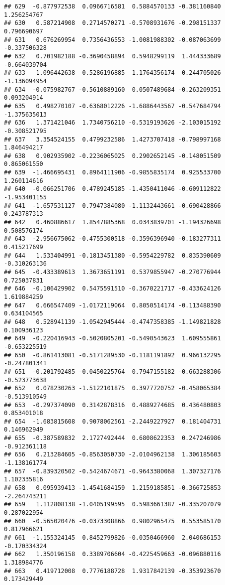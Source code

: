 \documentclass[
]{article}
\begin{document}
\begin{verbatim}
## 629  -0.877972538  0.0966716581  0.5884570133 -0.381160840  1.256254767
## 630   0.587214908  0.2714570271 -0.5708931676 -0.298151337  0.796690697
## 631   0.676269954  0.7356436553 -1.0081988302 -0.087063699 -0.337506328
## 632   0.701982188 -0.3690458894  0.5948299119  1.444333689 -0.664039704
## 633   1.096442638  0.5286196885 -1.1764356174 -0.244705026 -1.136094954
## 634  -0.075982767 -0.5610889160  0.0507489684 -0.263209351  0.093204914
## 635   0.498270107 -0.6368012226 -1.6886443567 -0.547684794 -1.375635013
## 636   1.371421046  1.7340756210 -0.5319193626 -2.103015192 -0.308521795
## 637   3.354524155  0.4799232586  1.4273707418 -0.798997168  1.846494217
## 638   0.902935902 -0.2236065025  0.2902652145 -0.148051509  0.865061550
## 639  -1.466695431  0.8964111906 -0.9855835174  0.925533700  1.260114616
## 640  -0.066251706  0.4789245185 -1.4350411046 -0.609112822 -1.953401155
## 641  -1.657531127  0.7947384080 -1.1132443661 -0.690428866  0.243787313
## 642   0.460886617  1.8547885368  0.0343839701 -1.194326698  0.508576174
## 643  -2.956675062 -0.4755300518 -0.3596396940 -0.183277311  0.415217699
## 644   1.533404991 -0.1813451380 -0.5954229782  0.835390609 -0.310263136
## 645  -0.433389613  1.3673651191  0.5379855947 -0.270776944  0.725037831
## 646  -0.106429902  0.5475591510 -0.3670221717 -0.433624126  1.619884259
## 647   0.666547409 -1.0172119064  0.8050514174 -0.113488390  0.634104565
## 648   0.528941139 -1.0542945444 -0.4747358385 -1.149821828  0.100936123
## 649  -0.220416943 -0.5020805201 -0.5490543623  1.609555861 -0.653225519
## 650  -0.861413081 -0.5171289530 -0.1181191892  0.966132295 -0.247801341
## 651  -0.201792485 -0.0450225764  0.7947155182 -0.663288306 -0.523773638
## 652   0.078230263 -1.5122101875  0.3977720752 -0.458065384 -0.513910549
## 653  -0.297374090  0.3142878316  0.4889274685  0.436480803  0.853401018
## 654  -1.683815608  0.9078062561 -2.2449227927  0.181404731  0.146962949
## 655  -0.387589832  2.1727492444  0.6808622353  0.247246986 -0.912361118
## 656   0.213284605 -0.8563050730 -2.0104962138  1.306185603 -1.138161774
## 657  -0.839320502 -0.5424674671 -0.9643380068  1.307327176  1.102335816
## 658   0.095939413 -1.4541684159  1.2159185851 -0.366725853 -2.264743211
## 659   1.112808138 -1.0405199595  0.5983661387 -0.335207079  0.287022954
## 660  -0.565020476 -0.0373308866  0.9802965475  0.553585170  0.817966621
## 661  -1.155324145  0.8452799826 -0.0350466960  2.040686153 -0.170334324
## 662   1.350196158  0.3389706604 -0.4225459663 -0.096880116  1.318984776
## 663   0.419712008  0.7776188728  1.9317842139 -0.353923670  0.173429449

\end{verbatim}
\end{document}
